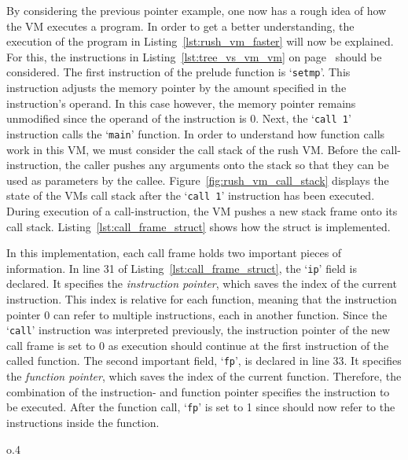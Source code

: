 By considering the previous pointer example, one now has a rough idea of how the VM executes a program.
In order to get a better understanding, the execution of the program in Listing~\ref{lst:rush_vm_faster} will now be explained.
For this, the instructions in Listing~\ref{lst:tree_vs_vm_vm} on page~\pageref{lst:tree_vs_vm_vm} should be considered.
The first instruction of the prelude function is `\texttt{setmp}'.
This instruction adjusts the memory pointer by the amount specified in the instruction's operand.
In this case however, the memory pointer remains unmodified since the operand of the instruction is 0.
Next, the `\texttt{call 1}' instruction calls the `\texttt{main}' function.
In order to understand how function calls work in this VM, we must consider the call stack of the rush VM\@.
Before the call-instruction, the caller pushes any arguments onto the stack so that they can be used as parameters by the callee.
Figure~\ref{fig:rush_vm_call_stack} displays the state of the VMs call stack after the `\texttt{call 1}' instruction has been executed.
During execution of a call-instruction, the VM pushes a new stack frame onto its call stack.
Listing~\ref{lst:call_frame_struct} shows how the  struct is implemented.


In this implementation, each call frame holds two important pieces of information.
In line 31 of Listing~\ref{lst:call_frame_struct}, the `\texttt{ip}' field is declared.
It specifies the \emph{instruction pointer}, which saves the index of the current instruction.
This index is relative for each function, meaning that the instruction pointer 0 can refer to multiple instructions,
each in another function.
Since the `\texttt{call}' instruction was interpreted previously, the instruction pointer of the new call frame is set to 0 as execution should continue at the first instruction of the called function.
The second important field, `\texttt{fp}', is declared in line 33.
It specifies the \emph{function pointer}, which saves the index of the current function.
Therefore, the combination of the instruction- and function pointer specifies the instruction to be executed.
After the function call, `\texttt{fp}' is set to 1 since  should now refer to the instructions inside the  function.

\begin{wrapfigure}{o}{.4\textwidth}
	\centering
	\caption{Example call stack of the rush VM.}\label{fig:rush_vm_call_stack}
\end{wrapfigure}


